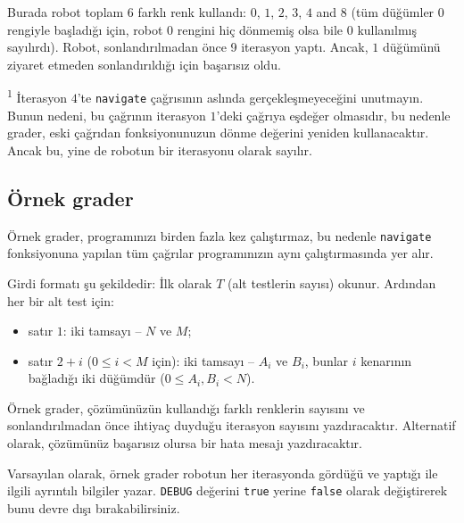 \documentclass[12pt]{article}
\begin{document}
Burada robot toplam $6$ farklı renk kullandı: $0$, $1$, $2$, $3$, $4$ and $8$ (tüm düğümler $0$ rengiyle başladığı için, robot $0$ rengini hiç dönmemiş olsa bile $0$ kullanılmış sayılırdı). Robot, sonlandırılmadan önce 9 iterasyon yaptı. Ancak, $1$ düğümünü ziyaret etmeden sonlandırıldığı için başarısız oldu.

\textsuperscript{1} İterasyon $4$'te \texttt{navigate} çağrısının aslında gerçekleşmeyeceğini unutmayın. Bunun nedeni, bu çağrının iterasyon $1$'deki çağrıya eşdeğer olmasıdır, bu nedenle grader, eski çağrıdan fonksiyonunuzun dönme değerini yeniden kullanacaktır. Ancak bu, yine de robotun bir iterasyonu olarak sayılır.

\subsection{Örnek grader}

Örnek grader, programınızı birden fazla kez çalıştırmaz, bu nedenle \texttt{navigate} fonksiyonuna yapılan tüm çağrılar programınızın aynı çalıştırmasında yer alır.

Girdi formatı şu şekildedir: İlk olarak $T$ (alt testlerin sayısı) okunur. Ardından her bir alt test için:
\begin{itemize}
\item satır $1$: iki tamsayı -- $N$ ve $M$;
\item satır $2+i$ ($0 \leq i < M$ için): iki tamsayı -- $A_i$ ve $B_i$, bunlar $i$ kenarının bağladığı iki düğümdür ($0 \leq A_i, B_i < N$).
\end{itemize}

Örnek grader, çözümünüzün kullandığı farklı renklerin sayısını ve sonlandırılmadan önce ihtiyaç duyduğu iterasyon sayısını yazdıracaktır. Alternatif olarak, çözümünüz başarısız olursa bir hata mesajı yazdıracaktır.

Varsayılan olarak, örnek grader robotun her iterasyonda gördüğü ve yaptığı ile ilgili ayrıntılı bilgiler yazar. \texttt{DEBUG} değerini \texttt{true} yerine \texttt{false} olarak değiştirerek bunu devre dışı bırakabilirsiniz.
\end{document}
